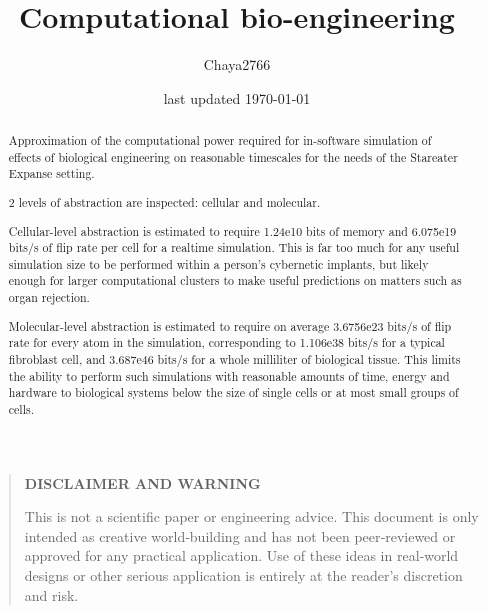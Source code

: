 \documentclass[a4paper]{article}
\title{Computational bio-engineering}
\author{Chaya2766}
\date{last updated \today}
\begin{document}
	\sffamily
	\sloppy
	
	\maketitle
	
	\vfill
	
	\begin{abstract}
		Approximation of the computational power required for in-software simulation of effects of biological engineering on reasonable timescales for the needs of the Stareater Expanse setting.
		
		\medskip
		
		2 levels of abstraction are inspected: cellular and molecular.
		
		\medskip
		
		Cellular-level abstraction is estimated to require 1.24e10 bits of memory and 6.075e19 bits/s of flip rate per cell for a realtime simulation. This is far too much for any useful simulation size to be performed within a person's cybernetic implants, but likely enough for larger computational clusters to make useful predictions on matters such as organ rejection.
		
		\medskip
		
		Molecular-level abstraction is estimated to require on average 3.6756e23 bits/s of flip rate for every atom in the simulation, corresponding to 1.106e38 bits/s for a typical fibroblast cell, and 3.687e46 bits/s for a whole milliliter of biological tissue. This limits the ability to perform such simulations with reasonable amounts of time, energy and hardware to biological systems below the size of single cells or at most small groups of cells.
	\end{abstract}
	
	\vfill
	
	\begin{quote}
		\begin{center}
			\textbf{DISCLAIMER AND WARNING}
		\end{center}
		
		This is not a scientific paper or engineering advice.
		This document is only intended as creative world‑building and has not been peer‑reviewed or approved for any practical application.
		Use of these ideas in real‑world designs or other serious application is entirely at the reader’s discretion and risk.
	\end{quote}
	
	\vfill
	
\end{document}
